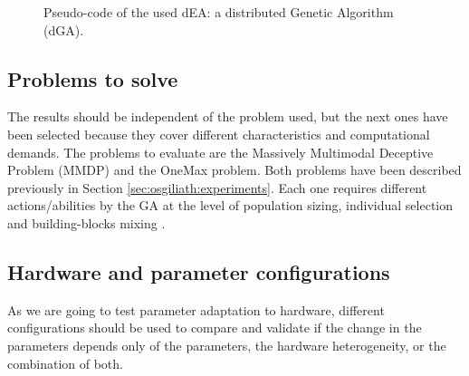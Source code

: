 \begin{figure}
\usebox{\algoadaptativebox}
\caption{Pseudo-code of the used dEA: a distributed Genetic Algorithm
  (dGA).} %
\label{fig:EAused}
\end{figure}




\subsection{Problems to solve}

The results should be independent of the problem used, but the next ones have been selected because they cover different characteristics
and computational demands. %
 The problems to evaluate are the Massively Multimodal Deceptive
Problem (MMDP)  and the OneMax problem. Both problems have been described previously in Section \ref{sec:osgiliath:experiments}. Each one requires different actions/abilities by the GA
at the level of population sizing, individual selection and
building-blocks mixing \cite{AsynchronousMultidemeMerelo08}. %




\subsection{Hardware and parameter configurations}


As we are going to test parameter adaptation to hardware, different configurations should be used to compare and validate if the change in the parameters depends only of the parameters, the hardware heterogeneity, or the combination of both.

